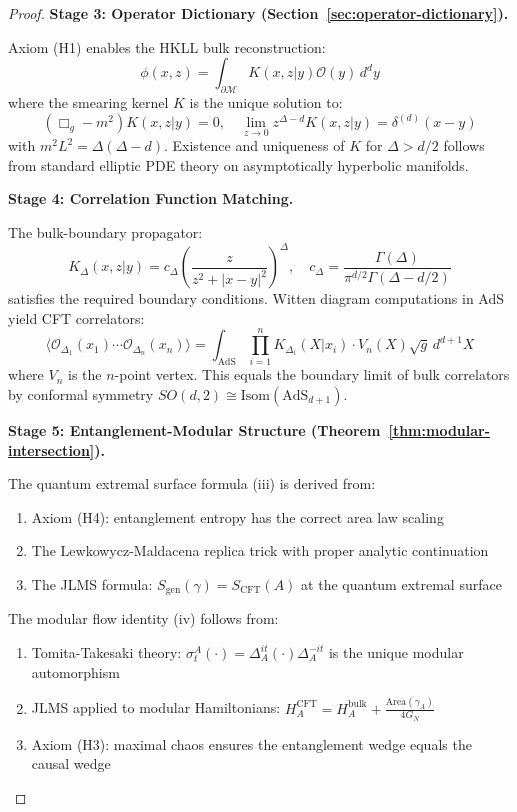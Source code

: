 \documentclass[12pt,a4paper]{article}
\begin{document}
\begin{proof}
\textbf{Stage 3: Operator Dictionary (Section~\ref{sec:operator-dictionary}).}

Axiom (H1) enables the HKLL bulk reconstruction:
\begin{equation}
\phi(x,z) = \int_{\partial\mathcal{M}} K(x,z|y)\mathcal{O}(y) \, d^dy
\end{equation}
where the smearing kernel $K$ is the unique solution to:
\begin{equation}
(\Box_g - m^2)K(x,z|y) = 0, \quad \lim_{z\to 0} z^{\Delta-d} K(x,z|y) = \delta^{(d)}(x-y)
\end{equation}
with $m^2 L^2 = \Delta(\Delta-d)$. Existence and uniqueness of $K$ for $\Delta > d/2$ follows from standard elliptic PDE theory on asymptotically hyperbolic manifolds.

\textbf{Stage 4: Correlation Function Matching.}

The bulk-boundary propagator:
\begin{equation}
K_\Delta(x,z|y) = c_\Delta\left(\frac{z}{z^2+|x-y|^2}\right)^\Delta, \quad c_\Delta = \frac{\Gamma(\Delta)}{\pi^{d/2}\Gamma(\Delta-d/2)}
\end{equation}
satisfies the required boundary conditions. Witten diagram computations in AdS yield CFT correlators:
\begin{equation}
\langle \mathcal{O}_{\Delta_1}(x_1)\cdots\mathcal{O}_{\Delta_n}(x_n)\rangle = \int_{\text{AdS}} \prod_{i=1}^n K_{\Delta_i}(X|x_i) \cdot V_n(X) \sqrt{g} \, d^{d+1}X
\end{equation}
where $V_n$ is the $n$-point vertex. This equals the boundary limit of bulk correlators by conformal symmetry $SO(d,2) \cong \text{Isom}(\text{AdS}_{d+1})$.

\textbf{Stage 5: Entanglement-Modular Structure (Theorem~\ref{thm:modular-intersection}).}

The quantum extremal surface formula (iii) is derived from:
\begin{enumerate}
    \item Axiom (H4): entanglement entropy has the correct area law scaling
    \item The Lewkowycz-Maldacena replica trick with proper analytic continuation
    \item The JLMS formula: $S_{\text{gen}}(\gamma) = S_{\text{CFT}}(A)$ at the quantum extremal surface
\end{enumerate}

The modular flow identity (iv) follows from:
\begin{enumerate}
    \item Tomita-Takesaki theory: $\sigma_t^A(\cdot) = \Delta_A^{it}(\cdot)\Delta_A^{-it}$ is the unique modular automorphism
    \item JLMS applied to modular Hamiltonians: $H_A^{\text{CFT}} = H_A^{\text{bulk}} + \frac{\text{Area}(\gamma_A)}{4G_N}$
    \item Axiom (H3): maximal chaos ensures the entanglement wedge equals the causal wedge
\end{enumerate}


\end{proof}
\end{document}

